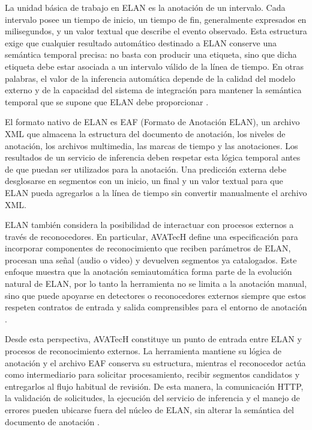 La unidad básica de trabajo en ELAN es la anotación de un intervalo. Cada intervalo posee un tiempo de inicio, un tiempo de fin, generalmente expresados en milisegundos, y un valor textual que describe el evento observado. Esta estructura exige que cualquier resultado automático destinado a ELAN conserve una semántica temporal precisa: no basta con producir una etiqueta, sino que dicha etiqueta debe estar asociada a un intervalo válido de la línea de tiempo. En otras palabras, el valor de la
inferencia automática depende de la calidad del modelo externo y de la capacidad del sistema
de integración para mantener la semántica temporal que se supone que ELAN debe proporcionar \cite{wittenburg2006elan}.

El formato nativo de ELAN es EAF (Formato de Anotación ELAN), un archivo XML que almacena la estructura del documento de anotación, los niveles de anotación, los archivos multimedia, las marcas de tiempo y las anotaciones\cite{wittenburg2006elan}. Los resultados de un servicio de inferencia deben respetar esta lógica temporal antes de que puedan ser utilizados para la anotación. Una predicción externa debe desglosarse en segmentos con un inicio, un final y un valor textual para que ELAN pueda agregarlos a la línea de tiempo sin convertir manualmente el archivo XML.

ELAN también considera la posibilidad de interactuar con procesos externos a través de reconocedores. En particular, AVATecH define una especificación para incorporar componentes de reconocimiento que reciben parámetros de ELAN, procesan una señal (audio o video) y devuelven segmentos ya catalogados. Este enfoque muestra que la anotación semiautomática forma parte de la evolución natural de ELAN, por lo tanto la herramienta no se limita a la anotación manual, sino que puede apoyarse en detectores o reconocedores externos siempre que estos respeten contratos de entrada y salida comprensibles para el entorno de anotación \cite{auer2010elan,auer2014avatech}.

Desde esta perspectiva, AVATecH constituye un punto de entrada entre ELAN y procesos de reconocimiento externos. La herramienta mantiene su lógica de anotación y el archivo EAF conserva su estructura, mientras el reconocedor actúa como intermediario para solicitar procesamiento, recibir segmentos candidatos y entregarlos al flujo habitual de revisión. De esta manera, la comunicación HTTP, la validación de solicitudes, la ejecución del servicio de inferencia y el manejo de errores pueden ubicarse fuera del núcleo de ELAN, sin alterar la semántica del documento de anotación \cite{auer2014avatech}.

